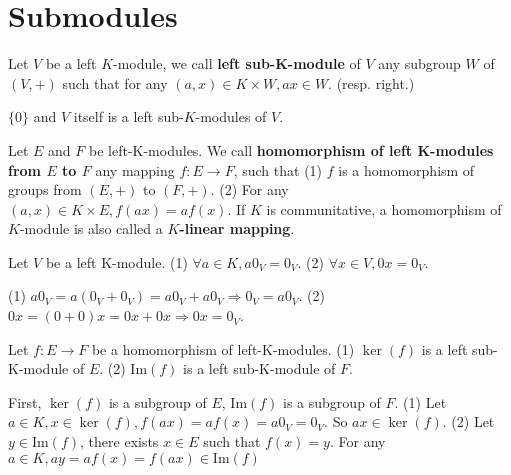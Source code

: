 \documentclass{book}
\numberwithin{equation}{section}
\begin{document}
\section{Submodules}
\begin{definitionenv}
    Let $V$ be a left $K$-module,  we call \textbf{left sub-K-module} of $V$ any subgroup $W$ of $(V, +)$ such that for any $(a, x)\in K\times W, ax\in W$. (resp. right.)
\end{definitionenv}
\begin{exampleenv}
    $\{0\}$ and $V$ itself is a left sub-$K$-modules of $V$.
\end{exampleenv}
\begin{definitionenv}
    Let $E$ and $F$ be left-K-modules. We call \textbf{homomorphism of left K-modules from $E$ to $F$} any mapping $f:E\rightarrow F$,  such that 
    \newline
    (1) $f$ is a homomorphism of groups from $(E, +)$ to $(F, +)$.
    \newline
    (2) For any $(a, x)\in K\times E, f(ax)=af(x)$.
    \newline
    If $K$ is communitative,  a homomorphism of $K$-module is also called a \textbf{$K$-linear mapping}.
\end{definitionenv}
\begin{lemmaenv}
    Let $V$ be a left K-module.
    \newline
    (1) $\forall a\in K, a0_V=0_V$.
    \newline
    (2) $\forall x\in V, 0x=0_V$.
\end{lemmaenv}
\begin{proofenv}
    \quad
    \newline
    (1) $a0_V=a(0_V+0_V)=a0_V+a0_V\Rightarrow 0_V=a0_V$.
    \newline
    (2) $0x=(0+0)x=0x+0x\Rightarrow 0x=0_V$.
\end{proofenv}
\begin{theoremenv}
    Let $f:E\rightarrow F$ be a homomorphism of left-K-modules.
    \newline 
    (1) $\ker(f)$ is a left sub-K-module of $E$.
    \newline
    (2) $\mathrm{Im}(f)$ is a left sub-K-module of $F$. 
\end{theoremenv}
\begin{proofenv}
    First,  $\ker(f)$ is a subgroup of $E$,  $\mathrm{Im}(f)$ is a subgroup of $F$.
    \newline
    (1) Let $a\in K,  x\in \ker(f),  f(ax)=af(x)=a0_V=0_V$. So $ax\in \ker(f)$.
    \newline
    (2) Let $y\in \mathrm{Im}(f)$,  there exists $x\in E$ such that $f(x)=y$. For any $a\in K, ay=af(x)=f(ax)\in \mathrm{Im}(f)$
\end{proofenv}
\end{document}
